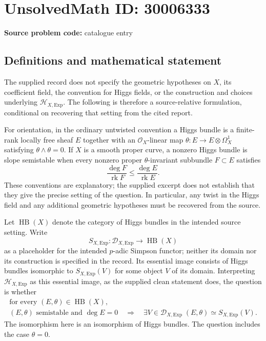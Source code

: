 \documentclass[11pt]{article}
\begin{document}
\section*{UnsolvedMath ID: 30006333}
\textbf{Source problem code:} catalogue entry
\subsection{Definitions and mathematical statement}
The supplied record does not specify the geometric hypotheses on \(X\), its coefficient field, the convention for Higgs fields, or the construction and choices underlying \(\mathcal H_{X,\mathrm{Exp}}\). The following is therefore a source-relative formulation, conditional on recovering that setting from the cited report.

For orientation, in the ordinary untwisted convention a Higgs bundle is a finite-rank locally free sheaf \(E\) together with an \(\mathcal O_X\)-linear map \(\theta:E\to E\otimes\Omega_X^1\) satisfying \(\theta\wedge\theta=0\). If \(X\) is a smooth proper curve, a nonzero Higgs bundle is slope semistable when every nonzero proper \(\theta\)-invariant subbundle \(F\subset E\) satisfies
\[
\frac{\deg F}{\operatorname{rk}F}\leq\frac{\deg E}{\operatorname{rk}E}.
\]
These conventions are explanatory; the supplied excerpt does not establish that they give the precise setting of the question. In particular, any twist in the Higgs field and any additional geometric hypotheses must be recovered from the source.

Let \(\operatorname{HB}(X)\) denote the category of Higgs bundles in the intended source setting. Write
\[
S_{X,\mathrm{Exp}}:\mathcal D_{X,\mathrm{Exp}}\longrightarrow\operatorname{HB}(X)
\]
as a placeholder for the intended \(p\)-adic Simpson functor; neither its domain nor its construction is specified in the record. Its essential image consists of Higgs bundles isomorphic to \(S_{X,\mathrm{Exp}}(V)\) for some object \(V\) of its domain. Interpreting \(\mathcal H_{X,\mathrm{Exp}}\) as this essential image, as the supplied clean statement does, the question is whether
\[
\begin{gathered}
\text{for every }(E,\theta)\in\operatorname{HB}(X),\\
(E,\theta)\text{ semistable and }\deg E=0
\quad\Longrightarrow\quad
\exists V\in\mathcal D_{X,\mathrm{Exp}}\;
(E,\theta)\simeq S_{X,\mathrm{Exp}}(V).
\end{gathered}
\]
The isomorphism here is an isomorphism of Higgs bundles. The question includes the case \(\theta=0\).
\end{document}
